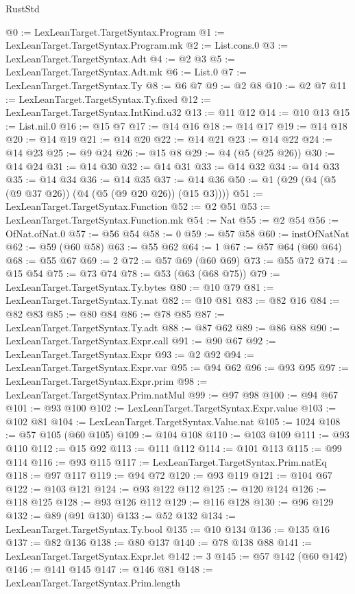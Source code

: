 \begin{lexlean}{RustStd}
\begin{coremodule}
@0 := LexLeanTarget.TargetSyntax.Program
@1 := LexLeanTarget.TargetSyntax.Program.mk
@2 := List.cons.{0}
@3 := LexLeanTarget.TargetSyntax.Adt
@4 := @2 @3
@5 := LexLeanTarget.TargetSyntax.Adt.mk
@6 := List.{0}
@7 := LexLeanTarget.TargetSyntax.Ty
@8 := @6 @7
@9 := @2 @8
@10 := @2 @7
@11 := LexLeanTarget.TargetSyntax.Ty.fixed
@12 := LexLeanTarget.TargetSyntax.IntKind.u32
@13 := @11 @12
@14 := @10 @13
@15 := List.nil.{0}
@16 := @15 @7
@17 := @14 @16
@18 := @14 @17
@19 := @14 @18
@20 := @14 @19
@21 := @14 @20
@22 := @14 @21
@23 := @14 @22
@24 := @14 @23
@25 := @9 @24
@26 := @15 @8
@29 := @4 (@5 (@25 @26))
@30 := @14 @24
@31 := @14 @30
@32 := @14 @31
@33 := @14 @32
@34 := @14 @33
@35 := @14 @34
@36 := @14 @35
@37 := @14 @36
@50 := @1 (@29 (@4 (@5 (@9 @37 @26)) (@4 (@5 (@9 @20 @26)) (@15 @3))))
@51 := LexLeanTarget.TargetSyntax.Function
@52 := @2 @51
@53 := LexLeanTarget.TargetSyntax.Function.mk
@54 := Nat
@55 := @2 @54
@56 := OfNat.ofNat.{0}
@57 := @56 @54
@58 := 0
@59 := @57 @58
@60 := instOfNatNat
@62 := @59 (@60 @58)
@63 := @55 @62
@64 := 1
@67 := @57 @64 (@60 @64)
@68 := @55 @67
@69 := 2
@72 := @57 @69 (@60 @69)
@73 := @55 @72
@74 := @15 @54
@75 := @73 @74
@78 := @53 (@63 (@68 @75))
@79 := LexLeanTarget.TargetSyntax.Ty.bytes
@80 := @10 @79
@81 := LexLeanTarget.TargetSyntax.Ty.nat
@82 := @10 @81
@83 := @82 @16
@84 := @82 @83
@85 := @80 @84
@86 := @78 @85
@87 := LexLeanTarget.TargetSyntax.Ty.adt
@88 := @87 @62
@89 := @86 @88
@90 := LexLeanTarget.TargetSyntax.Expr.call
@91 := @90 @67
@92 := LexLeanTarget.TargetSyntax.Expr
@93 := @2 @92
@94 := LexLeanTarget.TargetSyntax.Expr.var
@95 := @94 @62
@96 := @93 @95
@97 := LexLeanTarget.TargetSyntax.Expr.prim
@98 := LexLeanTarget.TargetSyntax.Prim.natMul
@99 := @97 @98
@100 := @94 @67
@101 := @93 @100
@102 := LexLeanTarget.TargetSyntax.Expr.value
@103 := @102 @81
@104 := LexLeanTarget.TargetSyntax.Value.nat
@105 := 1024
@108 := @57 @105 (@60 @105)
@109 := @104 @108
@110 := @103 @109
@111 := @93 @110
@112 := @15 @92
@113 := @111 @112
@114 := @101 @113
@115 := @99 @114
@116 := @93 @115
@117 := LexLeanTarget.TargetSyntax.Prim.natEq
@118 := @97 @117
@119 := @94 @72
@120 := @93 @119
@121 := @104 @67
@122 := @103 @121
@124 := @93 @122 @112
@125 := @120 @124
@126 := @118 @125
@128 := @93 @126 @112
@129 := @116 @128
@130 := @96 @129
@132 := @89 (@91 @130)
@133 := @52 @132
@134 := LexLeanTarget.TargetSyntax.Ty.bool
@135 := @10 @134
@136 := @135 @16
@137 := @82 @136
@138 := @80 @137
@140 := @78 @138 @88
@141 := LexLeanTarget.TargetSyntax.Expr.let
@142 := 3
@145 := @57 @142 (@60 @142)
@146 := @141 @145
@147 := @146 @81
@148 := LexLeanTarget.TargetSyntax.Prim.length

\end{coremodule}
\end{lexlean}
